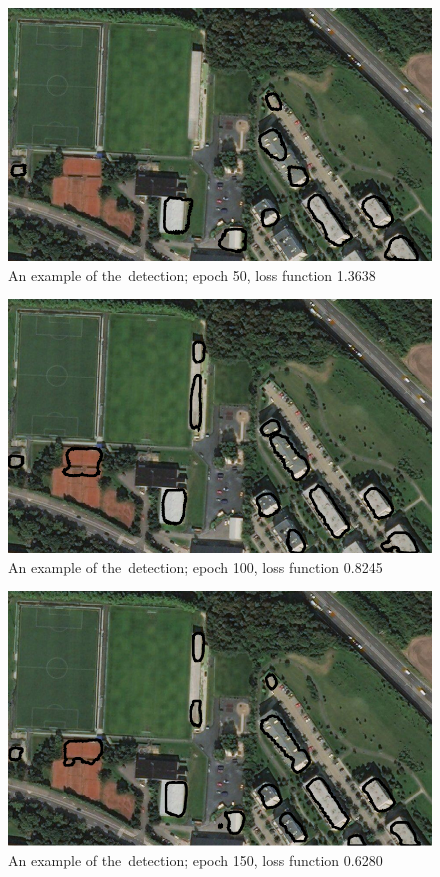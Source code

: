 \begin{figure}[H]
   \centering
	\includegraphics[width=.9\linewidth]{./pictures/out_b_50.png}
	\caption[Detection of buildings, example]{An example of the~detection; epoch
	50, loss function 1.3638}
      \label{fig:build-4}
\end{figure}

\begin{figure}[H]
   \centering
	\includegraphics[width=.9\linewidth]{./pictures/out_b_100.png}
	\caption[Detection of buildings, example]{An example of the~detection; epoch
	100, loss function 0.8245}
      \label{fig:build-5}
\end{figure}

\begin{figure}[H]
   \centering
	\includegraphics[width=.9\linewidth]{./pictures/out_b_150.png}
	\caption[Detection of buildings, example]{An example of the~detection; epoch
	150, loss function 0.6280}
      \label{fig:build-6}
\end{figure}

